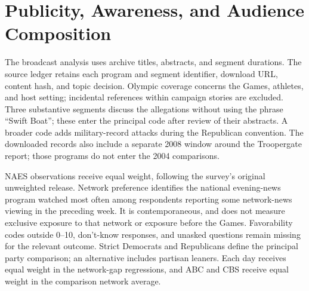 \documentclass[11pt]{article}
\newcommand{\TableStyle}{\small\setlength{\tabcolsep}{5pt}\renewcommand{\arraystretch}{1.12}}
\begin{document}
\section{Publicity, Awareness, and Audience Composition}

The broadcast analysis uses archive titles, abstracts, and segment durations. The source ledger retains each program and segment identifier, download URL, content hash, and topic decision. Olympic coverage concerns the Games, athletes, and host setting; incidental references within campaign stories are excluded. Three substantive segments discuss the allegations without using the phrase ``Swift Boat''; these enter the principal code after review of their abstracts. A broader code adds military-record attacks during the Republican convention. The downloaded records also include a separate 2008 window around the Troopergate report; those programs do not enter the 2004 comparisons.

NAES observations receive equal weight, following the survey's original unweighted release. Network preference identifies the national evening-news program watched most often among respondents reporting some network-news viewing in the preceding week. It is contemporaneous, and does not measure exclusive exposure to that network or exposure before the Games. Favorability codes outside 0--10, don't-know responses, and unasked questions remain missing for the relevant outcome. Strict Democrats and Republicans define the principal party comparison; an alternative includes partisan leaners. Each day receives equal weight in the network-gap regressions, and ABC and CBS receive equal weight in the comparison network average.

\begin{table}[htbp]
\centering\TableStyle
\caption{Awareness of the Swift Boat advertisement around the Olympics opening}
\label{tab:awareness}

\caption*{Unweighted NAES respondents naming ABC, CBS, or NBC as their most-watched national network news and answering the awareness question. ``Aware'' combines having seen the advertisement and having heard of it. August 13 interviews are omitted because interview times cannot establish exposure to that evening's coverage. The remaining interviews span four days before and three days after the opening; no time-series significance claim is made from this short comparison.}
\end{table}
\end{document}
